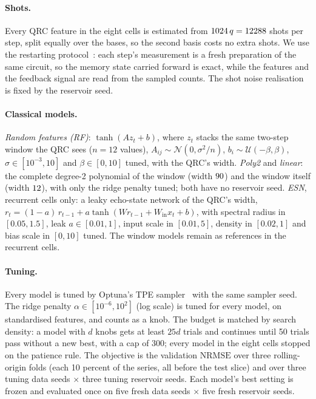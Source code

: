 \documentclass[11pt,a4paper]{article}
\newcommand{\nrmse}{\mathrm{NRMSE}}
\begin{document}
\paragraph{Shots.} Every QRC feature in the eight cells is estimated from $1024\,q=12288$ shots per
step, split equally over the bases, so the second basis costs no extra shots. We use the restarting
protocol~\cite{mujal2023}: each step's measurement is a fresh preparation of the same circuit, so the
memory state carried forward is exact, while the features and the feedback signal are read from the
sampled counts. The shot noise realisation is fixed by the reservoir seed.

\paragraph{Classical models.} \emph{Random features (RF)}: $\tanh(A z_t + b)$, where $z_t$ stacks
the same two-step window the QRC sees ($n=12$ values), $A_{ij}\sim\mathcal{N}(0,\sigma^2/n)$,
$b_i\sim\mathcal{U}(-\beta,\beta)$, $\sigma\in[10^{-3},10]$ and $\beta\in[0,10]$ tuned, with the
QRC's width. \emph{Poly2} and \emph{linear}: the complete degree-2 polynomial of the window (width
$90$) and the window itself (width $12$), with only the ridge penalty tuned; both have
no reservoir seed. \emph{ESN}, recurrent cells only: a leaky echo-state network of the QRC's width,
$r_t=(1-a)\,r_{t-1}+a\tanh(W r_{t-1}+W_{\mathrm{in}}x_t+b)$, with spectral radius in $[0.05,1.5]$,
leak $a\in[0.01,1]$, input scale in $[0.01,5]$, density in $[0.02,1]$ and bias scale in $[0,10]$
tuned. The window models remain as references in the recurrent cells.

\paragraph{Tuning.} Every model is tuned by Optuna's TPE sampler~\cite{akiba2019} with the same
sampler seed. The ridge penalty $\alpha\in[10^{-6},10^{2}]$ (log scale) is tuned for every model, on
standardised features, and counts as a knob. The budget is matched by search density: a model with
$d$ knobs gets at least $25d$ trials and continues until 50 trials pass without a new best, with a
cap of 300; every model in the eight cells stopped on the patience rule. The objective is the
validation $\nrmse$ over three rolling-origin folds (each 10 percent of the series, all before the
test slice) and over three tuning data seeds $\times$ three tuning reservoir seeds. Each model's best
setting is frozen and evaluated once on five fresh data seeds $\times$ five fresh reservoir seeds.
\end{document}
